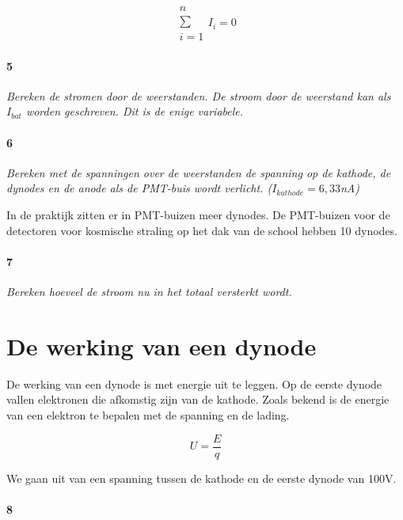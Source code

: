 \begin{equation}
\begin{array}{c} 
n\\ 
\sum\\ 
i=1
\end{array}
I_{i}=0
\end{equation}

\paragraph{5}

\textit{Bereken de stromen door de weerstanden. De stroom door de weerstand 
kan als $I_{bat}$ worden geschreven. Dit is de enige variabele.}

\paragraph{6}

\textit{Bereken met de spanningen over de weerstanden de spanning op de kathode, de dynodes en de anode
als de PMT-buis wordt verlicht. ($I_{kathode}=6,33$nA)}

In de praktijk zitten er in PMT-buizen meer dynodes. De PMT-buizen
voor de detectoren voor kosmische straling op het dak van de school
hebben 10 dynodes.


\paragraph{7}

\textit{Bereken hoeveel de stroom nu in het totaal versterkt wordt.}


\section{De werking van een dynode}

De werking van een dynode is met energie uit te leggen. Op de eerste
dynode vallen elektronen die afkomstig zijn van de kathode. Zoals
bekend is de energie van een elektron te bepalen met de spanning en
de lading.

\begin{equation}
U=\frac{E}{q}
\end{equation}


We gaan uit van een spanning tussen de kathode en de eerste dynode van 100V.


\paragraph{8}

